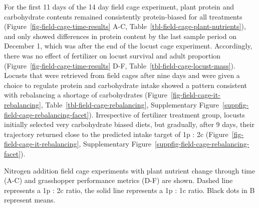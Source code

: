 \documentclass[
]{article}
\begin{document}
For the first 11 days of the 14 day field cage experiment, plant protein
and carbohydrate contents remained consistently protein-biased for all
treatments (Figure~\ref{fig-field-cage-time-results} A-C,
Table~\ref{tbl-field-cage-plant-nutrients}), and only showed differences
in protein content by the last sample period on December 1, which was
after the end of the locust cage experiment. Accordingly, there was no
effect of fertilizer on locust survival and adult proportion
(Figure~\ref{fig-field-cage-time-results} D-F,
Table~\ref{tbl-field-cage-locust-mass}). Locusts that were retrieved
from field cages after nine days and were given a choice to regulate
protein and carbohydrate intake showed a pattern consistent with
rebalancing a shortage of carbohydrates
(Figure~\ref{fig-field-cage-it-rebalancing},
Table~\ref{tbl-field-cage-rebalancing},
Supplementary Figure~\ref{suppfig-field-cage-rebalancing-facet}).
Irrespective of fertilizer treatment group, locusts initially selected
very carbohydrate biased diets, but gradually, after 9 days, their
trajectory returned close to the predicted intake target of 1p : 2c
(Figure~\ref{fig-field-cage-it-rebalancing},
Supplementary Figure~\ref{suppfig-field-cage-rebalancing-facet}).

\begin{fig}


\caption{\label{fig-field-cage-time-results}Nitrogen addition field cage
experiments with plant nutrient change through time (A-C) and
grasshopper performance metrics (D-F) are shown. Dashed line represents
a 1p : 2c ratio, the solid line represents a 1p : 1c ratio. Black dots
in B represent means.}

\end{fig}%
\end{document}
